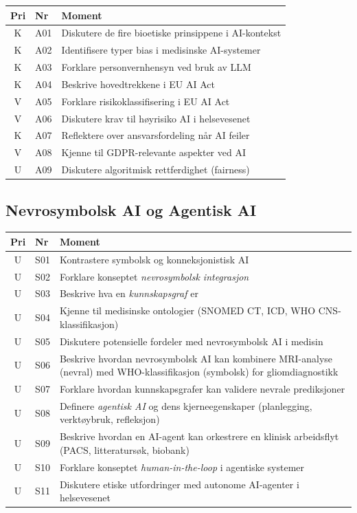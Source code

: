 \documentclass[11pt,a4paper]{article}
\begin{document}
\begin{longtable}{@{}clp{9cm}@{}}
\toprule
\textbf{Pri} & \textbf{Nr} & \textbf{Moment} \\
\midrule
\endfirsthead
\midrule
\endhead
\midrule
\endfoot
\bottomrule
\endlastfoot
K & A01 & Diskutere de fire bioetiske prinsippene i AI-kontekst \\
K & A02 & Identifisere typer bias i medisinske AI-systemer \\
K & A03 & Forklare personvernhensyn ved bruk av LLM \\
K & A04 & Beskrive hovedtrekkene i EU AI Act \\
V & A05 & Forklare risikoklassifisering i EU AI Act \\
V & A06 & Diskutere krav til høyrisiko AI i helsevesenet \\
K & A07 & Reflektere over ansvarsfordeling når AI feiler \\
V & A08 & Kjenne til GDPR-relevante aspekter ved AI \\
U & A09 & Diskutere algoritmisk rettferdighet (fairness) \\
\end{longtable}

\subsection{Nevrosymbolsk AI og Agentisk AI}

\begin{longtable}{@{}clp{9cm}@{}}
\toprule
\textbf{Pri} & \textbf{Nr} & \textbf{Moment} \\
\midrule
\endfirsthead
\midrule
\endhead
\midrule
\endfoot
\bottomrule
\endlastfoot
U & S01 & Kontrastere symbolsk og konneksjonistisk AI \\
U & S02 & Forklare konseptet \emph{nevrosymbolsk integrasjon} \\
U & S03 & Beskrive hva en \emph{kunnskapsgraf} er \\
U & S04 & Kjenne til medisinske ontologier (SNOMED CT, ICD, WHO CNS-klassifikasjon) \\
U & S05 & Diskutere potensielle fordeler med nevrosymbolsk AI i medisin \\
U & S06 & Beskrive hvordan nevrosymbolsk AI kan kombinere MRI-analyse (nevral) med WHO-klassifikasjon (symbolsk) for gliomdiagnostikk \\
U & S07 & Forklare hvordan kunnskapsgrafer kan validere nevrale prediksjoner \\
U & S08 & Definere \emph{agentisk AI} og dens kjerneegenskaper (planlegging, verktøybruk, refleksjon) \\
U & S09 & Beskrive hvordan en AI-agent kan orkestrere en klinisk arbeidsflyt (PACS, litteratursøk, biobank) \\
U & S10 & Forklare konseptet \emph{human-in-the-loop} i agentiske systemer \\
U & S11 & Diskutere etiske utfordringer med autonome AI-agenter i helsevesenet \\
\end{longtable}
\end{document}
